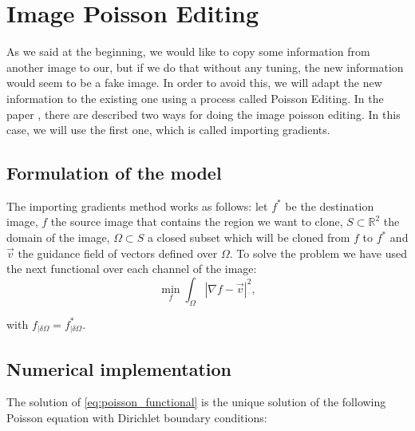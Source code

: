 \documentclass[10pt,a4paper]{llncs}
\begin{document}

\section{Image Poisson Editing}\label{sec:poisson}
As we said at the beginning, we would like to copy some information from another image to our, but if we do that without any tuning, the new information would seem to be a fake image. In order to avoid this, we will adapt the new information to the existing one using a process called Poisson Editing. In the paper \cite{perez2003poisson}, there are described two ways for doing the image poisson editing. In this case, we will use the first one, which is called importing gradients.
\subsection{Formulation of the model}
The importing gradients method works as follows: let $f^{*}$ be the destination image, $f$ the source image that contains the region we want to clone,  $S \subset \mathbb{R}^{2}$ the domain of the image, $\Omega \subset  S$ a closed subset which will be cloned from $f$ to $f^{*}$  and $\overrightarrow{v}$ the guidance field of vectors defined over $\Omega$. To solve the problem we have used the next functional over each channel of the image:
\begin{equation}
\min_{f}\int_{\Omega }\left | \nabla f-\overrightarrow{v} \right |^{2},
\label{eq:poisson_functional}
\end{equation}

with $f_{\mid \delta \Omega}=f_{\mid \delta \Omega}^{*}.$



\subsection{Numerical implementation}
The solution of \ref{eq:poisson_functional}  is the unique solution of the following Poisson equation with Dirichlet boundary conditions:
\end{document}
